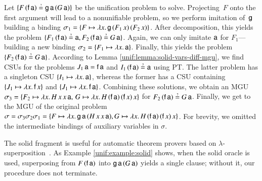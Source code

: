  \begin{exa}
   \label{unif:example:solid}
  Let $\{F \, (\cst{f} \, \cst{a}) \unif \cst{g} \, \cst{a} \, (G \, \cst{a})\}$ be
  the unification problem to solve. Projecting~$F$ onto the first argument will
  lead to a nonunifiable problem, so we perform imitation of~$\mathsf{g}$ building a
  binding $\sigma_1 = \{ F \mapsto \lambda x.\, \mathsf{g} \, (F_1 \, x) \, (F_2 \, x)
  \}$. After decomposition, this yields the  problem $\{F_1
  \, (\cst{f} \, \cst{a}) \unif \cst{a}, \allowbreak F_2 \, (\cst{f} \, \cst{a}) \unif G \,
  \cst{a}\}$. Again, we can only imitate $\mathsf{a}$ for $F_1$---building a new 
  binding $\sigma_2 = \{F_1 \mapsto \lambda x.\, \mathsf{a} \}$. Finally, this
  yields the problem $\{ F_2 \, (\cst{f} \, \cst{a}) \unif G \, \cst{a} \}$.
  According to Lemma \ref{unif:lemma:solid-vars-diff-mgu}, we find CSUs for the
  problems $J_1 \, \mathsf{a} = \mathsf{f} \, \mathsf{a}$ and $I_1 \, (\cst{f} \, \cst{a})
  \unif \cst{a}$ using PT. The latter problem has a singleton CSU $\{I_1 \mapsto \lambda x.\,
  \mathsf{a}\}$, whereas the former has a CSU containing $\{ J_1 \mapsto \lambda x.\,
  \mathsf{f} \, x \}$ and $\{ J_1 \mapsto \lambda x.\, \mathsf{f} \, \mathsf{a} \}$.
  Combining these solutions, we obtain an MGU $\sigma_3 =
  \{ F_2 \mapsto \lambda x.\, H \, x \, x \, \mathsf{a},\,
  G   \mapsto \lambda x.\, H \, (\mathsf{f} \, \mathsf{a}) \, (\mathsf{f} \, x) \, x \}$ 
  for $F_2 \, (\cst{f}\, \cst{a}) \unif G \, \cst{a}$.
  Finally, we get to the MGU of the original problem $\sigma = \sigma_3 \sigma_2 \sigma_1 = \{ F
  \mapsto \lambda x.\, \mathsf{g} \, \mathsf{a} \, (H \, x \, x \, \mathsf{a}),\allowbreak G \mapsto
  \lambda x.\, H \, (\mathsf{f} \, \mathsf{a}) \, (\mathsf{f} \, x) \, x  \}$.
  For brevity, we omitted the intermediate bindings of auxiliary variables
  in $\sigma$.
\end{exa}

The solid fragment is useful for automatic theorem provers based on
$\lambda$-su\-per\-po\-si\-tion~\cite{bbtvw-21-sup-lam}. As Example \ref{unif:example:solid} shows, when the solid oracle
is used, superposing from $F \, (\mathsf{f} \, \mathsf{a})$ into $\mathsf{g} \, \mathsf{a}
\, (G \, \mathsf{a})$ yields a single clause; without it, our procedure does not
terminate.


